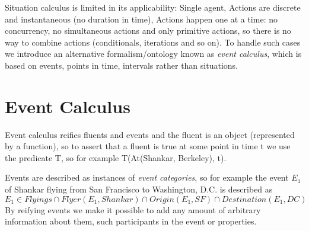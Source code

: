 Situation calculus is limited in its applicability: Single agent, Actions are discrete
and instantaneous (no duration in time), Actions happen one at a time: no concurrency,
no simultaneous actions and only primitive actions, so there is no way 
to combine actions (conditionals, iterations and so on).\newline
To handle such cases we introduce an alternative formalism/ontology known as
\emph{event calculus}, which is based on events, points in time,
intervals rather than situations.

\section{Event Calculus}
Event calculus reifies fluents and events and the fluent is an object 
(represented by a function), so to assert that a fluent is true at some point
in time t we use the predicate T, so for example 
T(At(Shankar, Berkeley), t).

Events are described as instances of \emph{event categories}, so for example
the event $E_1$ of Shankar flying from San Francisco to Washington, D.C. is described as
\[ E_1 \in Flyings \cap Flyer(E_1 , Shankar) \cap Origin(E_1 , SF ) \cap 
   Destination(E_1 , DC) \]
By reifying events we make it possible to add any amount of arbitrary information
about them, such participants in the event or properties.


